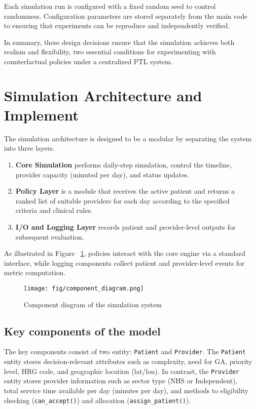 \documentclass[ %
                    author={Nattanan Nawakitbamrung},
                supervisor={Dr. Sébastien Rochat},
                    degree={MSc},
                     title={Developing and Evaluating the Impact of a Single Patient Treatment List (PTL) for an NHS Integrated Care System},
                  subtitle={},
                      type={},
                      year={2025}]{dissertation}
\begin{document}
\vspace{0.2cm}
Each simulation run is configured with a fixed random seed to control randomness. Configuration parameters are stored separately from the main code to ensuring that experiments can be reproduce and independently verified.

\vspace{0.5cm}
\noindent
In summary, these design decisions ensure that the simulation achieves both realism and flexibility, two essential conditions for experimenting with counterfactual policies under a centralized PTL system.

\section{Simulation Architecture and Implement}
The simulation architecture is designed to be a modular by separating the system into three layers.
\begin{enumerate}
    \item \textbf{Core Simulation} performs daily-step simulation, control the timeline, provider capacity (minuted per day), and status updates. 
    \item \textbf{Policy Layer} is a module that receives the active patient and returns a ranked list of suitable providers for each day according to the specified criteria and clinical rules.
    \item \textbf{I/O and Logging Layer} records patient and provider-level outputs for subsequent evaluation.
\end{enumerate}
As illustrated in Figure ~\ref{fig:comp-arch}, policies interact with the core engine via a standard interface, while logging components collect patient and provider-level events for metric computation.

\begin{figure}[htbp]
\centering
\texttt{[image: fig/component\_diagram.png]}
\caption{Component diagram of the simulation system}
\label{fig:comp-arch}
\end{figure}

\subsection{Key components of the model}
The key components consist of two entity: \texttt{Patient} and \texttt{Provider}. The \texttt{Patient} entity stores decision-relevant attributes such as complexity, need for GA, priority level, HRG code, and geographic location (lat/lon). In contrast, the \texttt{Provider} entity stores provider information such as sector type (NHS or Independent), total service time available per day (minutes per day), and methods to eligibility checking (\texttt{can\_accept()}) and allocation (\texttt{assign\_patient()}).
\end{document}
